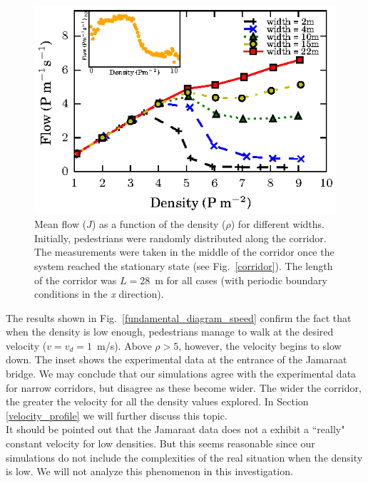 \begin{figure}[htbp!]
\includegraphics[width=\columnwidth]
{plots/flow-density_vd1_multiple_widths.eps}
\caption{\label{fundamental_diagram_flow} Mean flow ($J$) as a function of the density ($\rho$) for different widths. Initially, 
pedestrians were randomly distributed along the corridor. The measurements were taken in the middle
of the corridor once the system reached the stationary state (see Fig.~\ref{corridor}). The length of the corridor 
was $L=$28~m for all cases (with periodic boundary conditions in the \textit{x} direction).}
\end{figure}

The results shown in Fig.~\ref{fundamental_diagram_speed} confirm the fact that when the density is low enough, pedestrians manage to walk at the desired velocity ($v=v_d=1$~m/s). Above $\rho>5$, however, the velocity begins to slow down. The inset shows the experimental data at the entrance of the Jamaraat bridge. We may conclude that our simulations agree with the experimental data for narrow corridors, but disagree as these become wider. The wider the corridor, the greater the velocity for all the density values explored. In Section \ref{velocity_profile} we will further discuss this topic.\\

It should be pointed out that the Jamaraat data does not a exhibit a ``really" constant velocity for low densities. But this seems reasonable since our simulations do not include the complexities of the real situation when the density is low. We will not analyze this phenomenon in this investigation. \\

